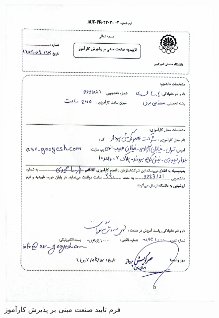 \begin{figure}[H]
  \centering
  \includegraphics[width=1\textwidth]{letters/taeed_sanaat.pdf}
  \caption{
    فرم تایید صنعت مبنی بر پذیرش کارآموز
  }
  \label{img:taeed_sanaat}
\end{figure}

